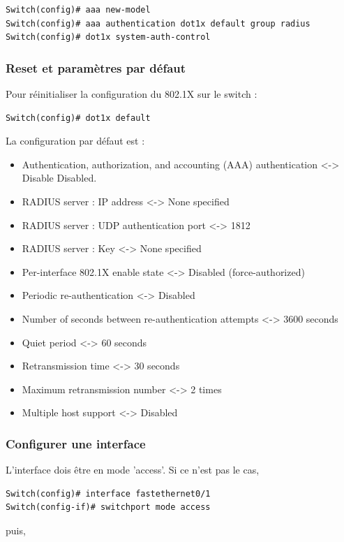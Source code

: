 \begin{verbatim}
Switch(config)# aaa new-model
Switch(config)# aaa authentication dot1x default group radius
Switch(config)# dot1x system-auth-control
\end{verbatim}

\subsubsection{Reset et paramètres par défaut}

Pour réinitialiser la configuration du 802.1X sur le switch :

\begin{verbatim}
Switch(config)# dot1x default
\end{verbatim}

La configuration par défaut est :
\begin{itemize}
\item Authentication, authorization, and accounting (AAA) authentication <-> Disable
Disabled. 
\item RADIUS server : IP address <-> None specified
\item RADIUS server : UDP authentication port <-> 1812
\item RADIUS server : Key <-> None specified
\item Per-interface 802.1X enable state <-> Disabled (force-authorized)
\item Periodic re-authentication <-> Disabled
\item Number of seconds between re-authentication attempts <-> 3600 seconds
\item Quiet period <-> 60 seconds
\item Retransmission time <-> 30 seconds
\item Maximum retransmission number <-> 2 times
\item Multiple host support <-> Disabled
\end{itemize}

\subsubsection{Configurer une interface}

L'interface dois être en mode 'access'. 
Si ce n'est pas le cas,
\begin{verbatim}
Switch(config)# interface fastethernet0/1
Switch(config-if)# switchport mode access
\end{verbatim}

puis,

